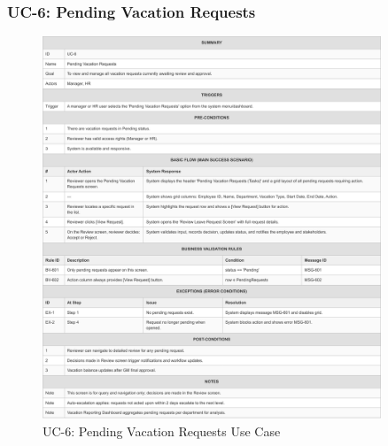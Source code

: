 \documentclass[12pt,a4paper]{article}
\begin{document}
\subsubsection{UC-6: Pending Vacation Requests}
\begin{figure}[H]
\centering
\includegraphics[width=0.9\textwidth]{Use-Cases/UC-6-Pending-Vacation-Requests/UC-6-Pending-Vacation-Requests-1.png}
\caption{UC-6: Pending Vacation Requests Use Case}
\label{fig:uc6}
\end{figure}
\end{document}
